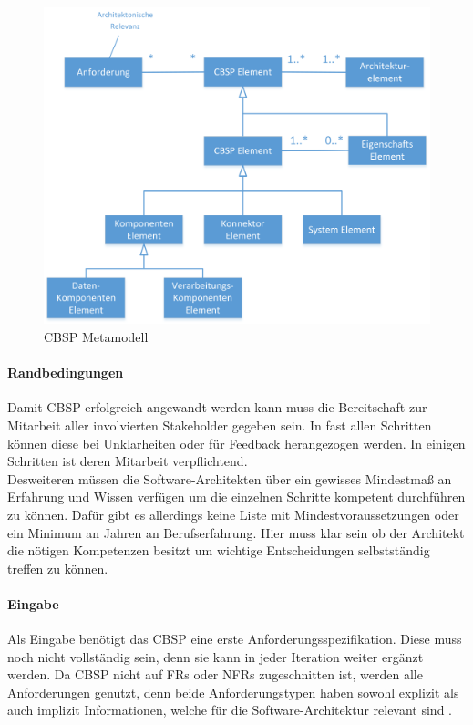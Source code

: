 \begin{figure}[h]
	\centering
	\includegraphics[scale=0.6]{cbsp_meta_model.png} 
	\caption{CBSP Metamodell \cite{Gru01}}
	\label{fig_cbsp_meta_model}
\end{figure}

\paragraph{Randbedingungen}

Damit CBSP erfolgreich angewandt werden kann muss die Bereitschaft zur Mitarbeit aller involvierten Stakeholder gegeben sein. In fast allen Schritten k\"onnen diese bei Unklarheiten oder f\"ur Feedback herangezogen werden. In einigen Schritten ist deren Mitarbeit verpflichtend. \\
Desweiteren m\"ussen die Software-Architekten \"uber ein gewisses Mindestma\ss{} an Erfahrung und Wissen verf\"ugen um die einzelnen Schritte kompetent durchf\"uhren zu k\"onnen. Daf\"ur gibt es allerdings keine Liste mit Mindestvoraussetzungen oder ein Minimum an Jahren an Berufserfahrung. Hier muss klar sein ob der Architekt die n\"otigen Kompetenzen besitzt um wichtige Entscheidungen selbstst\"andig treffen zu k\"onnen. \\

\paragraph{Eingabe}

Als Eingabe ben\"otigt das CBSP eine erste Anforderungsspezifikation. Diese muss noch nicht vollst\"andig sein, denn sie kann in jeder Iteration weiter erg\"anzt werden. Da CBSP nicht auf FRs oder NFRs zugeschnitten ist, werden alle Anforderungen genutzt, denn beide Anforderungstypen haben sowohl explizit als auch implizit Informationen, welche f\"ur die Software-Architektur relevant sind \cite{Gru01}. \\


